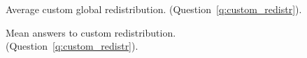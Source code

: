 \begin{figure}[h!]
    \caption[Average custom redistribution]{Average custom global redistribution. (Question~\ref{q:custom_redistr}).
    }\label{fig:custom_redistr_mean}
\end{figure}

\begin{figure}[h!]
    \caption[Average answers to custom redistribution]{Mean answers to custom redistribution. (Question~\ref{q:custom_redistr}).
    }\label{fig:custom_redistr_most}
\end{figure} 

